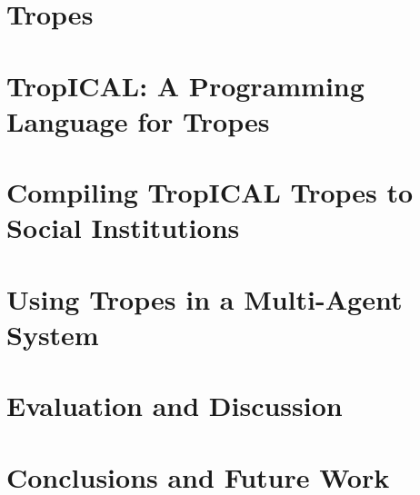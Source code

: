 \documentclass{article}
\begin{document}
\section{Tropes}

\section{TropICAL: A Programming Language for Tropes}

\section{Compiling TropICAL Tropes to Social Institutions}

\section{Using Tropes in a Multi-Agent System}

\section{Evaluation and Discussion}

\section{Conclusions and Future Work}




\end{document}
